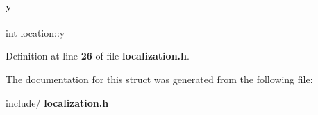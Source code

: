\mbox{\label{structlocation_ad7197d1981d4ea5d8b36041473cac815}} 
\paragraph{y}
{\footnotesize\ttfamily int location\+::y}



Definition at line \textbf{ 26} of file \textbf{ localization.\+h}.



The documentation for this struct was generated from the following file\+:\begin{DoxyCompactItemize}
\item 
include/\textbf{ localization.\+h}\end{DoxyCompactItemize}

